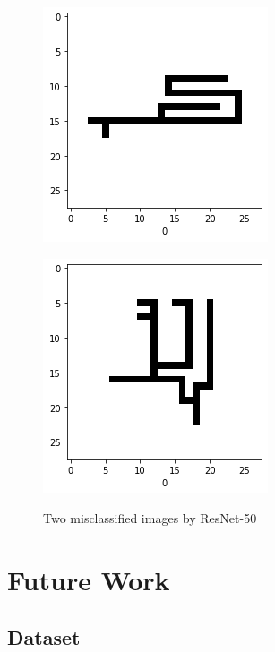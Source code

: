 \documentclass{article}
\begin{document}
\begin{figure}[H]
    \centering
    \begin{minipage}{.5\textwidth}
        \centering
        \includegraphics[width=.6\linewidth]{../image/miss1.png}
        \label{fig:miss1}
    \end{minipage}%
    \begin{minipage}{.5\textwidth}
        \centering
        \includegraphics[width=.6\linewidth]{../image/miss2.png}
        \label{fig:miss2}
    \end{minipage}
    \caption{Two misclassified images by ResNet-50}
\end{figure}

\section{Future Work}

\subsection{Dataset}
\end{document}

